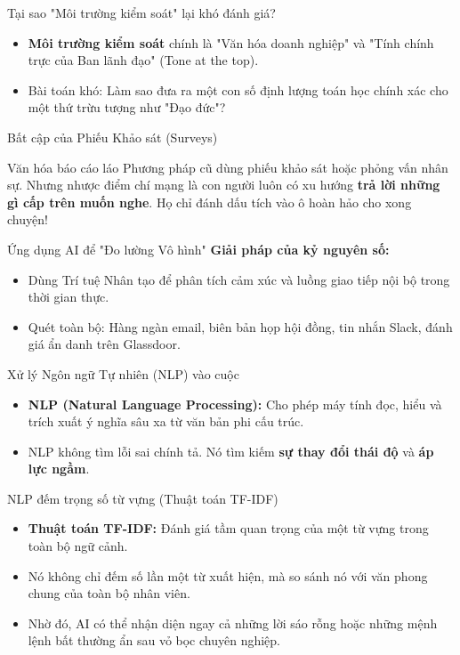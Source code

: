 \documentclass[aspectratio=169]{beamer}
\begin{document}
\begin{frame}{Tại sao "Môi trường kiểm soát" lại khó đánh giá?}
    \begin{itemize}
        \item \textbf{Môi trường kiểm soát} chính là "Văn hóa doanh nghiệp" và "Tính chính trực của Ban lãnh đạo" (Tone at the top).
        \item Bài toán khó: Làm sao đưa ra một con số định lượng toán học chính xác cho một thứ trừu tượng như "Đạo đức"?
    \end{itemize}
\end{frame}

\begin{frame}{Bất cập của Phiếu Khảo sát (Surveys)}
    \begin{alertblock}{Văn hóa báo cáo láo}
        Phương pháp cũ dùng phiếu khảo sát hoặc phỏng vấn nhân sự. Nhưng nhược điểm chí mạng là con người luôn có xu hướng \textbf{trả lời những gì cấp trên muốn nghe}. Họ chỉ đánh dấu tích vào ô hoàn hảo cho xong chuyện!
    \end{alertblock}
\end{frame}

\begin{frame}{Ứng dụng AI để "Đo lường Vô hình"}
    \textbf{Giải pháp của kỷ nguyên số:}
    \begin{itemize}
        \item Dùng Trí tuệ Nhân tạo để phân tích cảm xúc và luồng giao tiếp nội bộ trong thời gian thực.
        \item Quét toàn bộ: Hàng ngàn email, biên bản họp hội đồng, tin nhắn Slack, đánh giá ẩn danh trên Glassdoor.
    \end{itemize}
\end{frame}

\begin{frame}{Xử lý Ngôn ngữ Tự nhiên (NLP) vào cuộc}
    \begin{itemize}
        \item \textbf{NLP (Natural Language Processing):} Cho phép máy tính đọc, hiểu và trích xuất ý nghĩa sâu xa từ văn bản phi cấu trúc.
        \item NLP không tìm lỗi sai chính tả. Nó tìm kiếm \textbf{sự thay đổi thái độ} và \textbf{áp lực ngầm}.
    \end{itemize}
\end{frame}

\begin{frame}{NLP đếm trọng số từ vựng (Thuật toán TF-IDF)}
    \begin{itemize}
        \item \textbf{Thuật toán TF-IDF:} Đánh giá tầm quan trọng của một từ vựng trong toàn bộ ngữ cảnh.
        \item Nó không chỉ đếm số lần một từ xuất hiện, mà so sánh nó với văn phong chung của toàn bộ nhân viên.
        \item Nhờ đó, AI có thể nhận diện ngay cả những lời sáo rỗng hoặc những mệnh lệnh bất thường ẩn sau vỏ bọc chuyên nghiệp.
    \end{itemize}
\end{frame}
\end{document}
